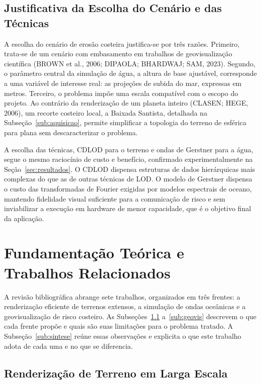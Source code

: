 \documentclass[conference]{IEEEtran}
\begin{document}
\subsection{Justificativa da Escolha do Cenário e das Técnicas}

A escolha do cenário de erosão costeira justifica-se por três razões.
Primeiro, trata-se de um cenário com embasamento em trabalhos de
geovisualização científica (BROWN et al., 2006; DIPAOLA; BHARDWAJ; SAM,
2023). Segundo, o parâmetro central da simulação de água, a altura de base
ajustável, corresponde a uma variável de interesse real: as projeções de
subida do mar, expressas em metros. Terceiro, o problema impõe uma escala
compatível com o escopo do projeto. Ao contrário da renderização de um
planeta inteiro (CLASEN; HEGE, 2006), um recorte costeiro local, a Baixada
Santista, detalhada na Subseção~\ref{sub:aquisicao}, permite simplificar a
topologia do terreno de esférica para plana sem descaracterizar o
problema.

A escolha das técnicas, CDLOD para o terreno e ondas de Gerstner para a
água, segue o mesmo raciocínio de custo e benefício, confirmado
experimentalmente na Seção~\ref{sec:resultados}. O CDLOD dispensa
estruturas de dados hierárquicas mais complexas do que as de outras
técnicas de LOD. O modelo de Gerstner dispensa o custo das transformadas de
Fourier exigidas por modelos espectrais de oceano, mantendo fidelidade
visual suficiente para a comunicação de risco e sem inviabilizar a
execução em hardware de menor capacidade, que é o objetivo final da
aplicação.

\section{Fundamentação Teórica e Trabalhos Relacionados}
\label{sec:fund}

A revisão bibliográfica abrange sete trabalhos, organizados em três
frentes: a renderização eficiente de terrenos extensos, a simulação de
ondas oceânicas e a geovisualização de risco costeiro. As
Subseções~\ref{sub:terreno} a~\ref{sub:geovis} descrevem o que cada frente
propõe e quais são suas limitações para o problema tratado. A
Subseção~\ref{sub:sintese} reúne essas observações e explicita o que este
trabalho adota de cada uma e no que se diferencia.

\subsection{Renderização de Terreno em Larga Escala}
\label{sub:terreno}
\end{document}

